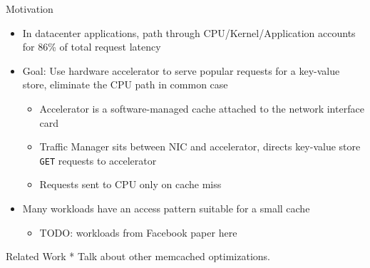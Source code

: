 \begin{block}{Motivation}
    \begin{itemize}
        \item In datacenter applications, path through CPU/Kernel/Application accounts for 86\% of total request latency
        \item Goal: Use hardware accelerator to serve popular requests for a key-value store, eliminate the CPU path in common case
            \begin{itemize}
                \item Accelerator is a software-managed cache attached to the network interface card
                \item Traffic Manager sits between NIC and accelerator, directs key-value store \texttt{GET} requests to accelerator
                \item Requests sent to CPU only on cache miss
            \end{itemize}
        \item Many workloads have an access pattern suitable for a small cache
            \begin{itemize}
                \item TODO: workloads from Facebook paper here
            \end{itemize}

    \end{itemize}    

\end{block}

\vspace{1ex}

\begin{block}{Related Work}
* Talk about other memcached optimizations.


\end{block}
